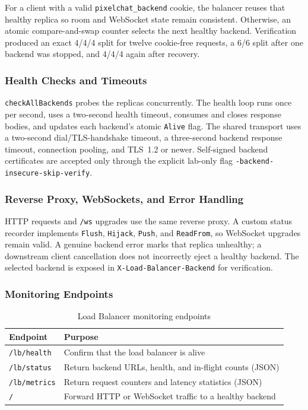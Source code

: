 \documentclass[12pt,a4paper]{article}
\begin{document}
For a client with a valid \texttt{pixelchat\_backend} cookie, the balancer reuses that healthy replica so room and WebSocket state remain consistent. Otherwise, an atomic compare-and-swap counter selects the next healthy backend. Verification produced an exact 4/4/4 split for twelve cookie-free requests, a 6/6 split after one backend was stopped, and 4/4/4 again after recovery.

\subsubsection{Health Checks and Timeouts}

\texttt{checkAllBackends} probes the replicas concurrently. The health loop runs once per second, uses a two-second health timeout, consumes and closes response bodies, and updates each backend's atomic \texttt{Alive} flag. The shared transport uses a two-second dial/TLS-handshake timeout, a three-second backend response timeout, connection pooling, and TLS~1.2 or newer. Self-signed backend certificates are accepted only through the explicit lab-only flag \texttt{-backend-insecure-skip-verify}.

\subsubsection{Reverse Proxy, WebSockets, and Error Handling}

HTTP requests and \texttt{/ws} upgrades use the same reverse proxy. A custom status recorder implements \texttt{Flush}, \texttt{Hijack}, \texttt{Push}, and \texttt{ReadFrom}, so WebSocket upgrades remain valid. A genuine backend error marks that replica unhealthy; a downstream client cancellation does not incorrectly eject a healthy backend. The selected backend is exposed in \texttt{X-Load-Balancer-Backend} for verification.

\subsubsection{Monitoring Endpoints}

\begin{table}[H]
\centering
\caption{Load Balancer monitoring endpoints}
\label{tab:endpoints}
\begin{tabular}{ll}
\toprule
\textbf{Endpoint} & \textbf{Purpose} \\
\midrule
\texttt{/lb/health}  & Confirm that the load balancer is alive \\
\texttt{/lb/status}  & Return backend URLs, health, and in-flight counts (JSON) \\
\texttt{/lb/metrics} & Return request counters and latency statistics (JSON) \\
\texttt{/}           & Forward HTTP or WebSocket traffic to a healthy backend \\
\bottomrule
\end{tabular}
\end{table}
\end{document}
